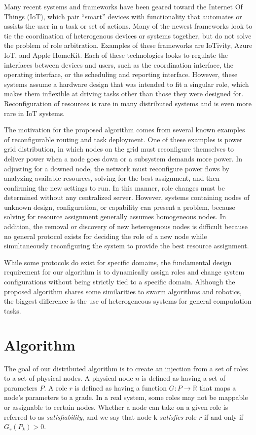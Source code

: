 \documentclass[11pt]{article}
\begin{document}
\begin{multicols}{2}
Many recent systems and frameworks have been geared toward the Internet Of Things (IoT), which pair ``smart'' devices with functionality that automates or assists the user in a task or set of actions.  Many of the newest frameworks look to tie the coordination of heterogenous devices or systems together, but do not solve the problem of role arbitration.  Examples of these frameworks are IoTivity, Azure IoT, and Apple HomeKit.  Each of these technologies looks to regulate the interfaces between devices and users, such as the coordination interface, the operating interface, or the scheduling and reporting interface. However, these systems assume a hardware design that was intended to fit a singular role, which makes them inflexible at driving tasks other than those they were designed for. Reconfiguration of resources is rare in many distributed systems and is even more rare in IoT systems.

The motivation for the proposed algorithm comes from several known examples of reconfigurable routing and task deployment.  One of these examples is power grid distribution, in which nodes on the grid must reconfigure themselves to deliver power when a node goes down or a subsystem demands more power.  In adjusting for a downed node, the network must reconfigure power flows by analyzing available resources, solving for the best assignment, and then confirming the new settings to run.  In this manner, role changes must be determined without any centralized server.  However, systems containing nodes of unknown design, configuration, or capability can present a problem, because solving for resource assignment generally assumes homogeneous nodes.  In addition, the removal or discovery of new heterogenous nodes is difficult because no general protocol exists for deciding the role of a new node while simultaneously reconfiguring the system to provide the best resource assignment.

While some protocols do exist for specific domains, the fundamental design requirement for our algorithm is to dynamically assign roles and change system configurations without being strictly tied to a specific domain. Although the proposed algorithm shares some similarities to swarm algorithms and robotics, the biggest difference is the use of heterogeneous systems for general computation tasks.

\section{Algorithm}
The goal of our distributed algorithm is to create an injection from a set of roles to a set of physical nodes. A physical node $n$ is defined as having a set of parameters $P$. A role $r$ is defined as having a function $G: P \rightarrow \mathbb{R}$ that maps a node's parameters to a grade. In a real system, some roles may not be mappable or assignable to certain nodes. Whether a node can take on a given role is referred to as \textit{satisfiability}, and we say that node k \textit{satisfies} role $r$ if and only if $G_{r}(P_{k}) > 0$.


\end{multicols}
\end{document}
